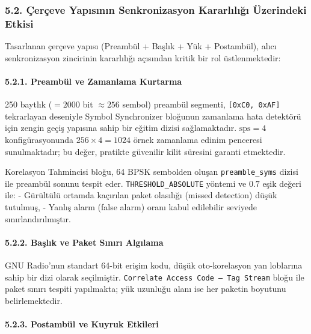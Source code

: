 \documentclass[
]{IEEEtran}
\begin{document}
\subsubsection{5.2. Çerçeve Yapısının Senkronizasyon Kararlılığı
Üzerindeki
Etkisi}\label{uxe7eruxe7eve-yapux131sux131nux131n-senkronizasyon-kararlux131lux131ux11fux131-uxfczerindeki-etkisi}

Tasarlanan çerçeve yapısı (Preambül + Başlık + Yük + Postambül), alıcı
senkronizasyon zincirinin kararlılığı açısından kritik bir rol
üstlenmektedir:

\paragraph{5.2.1. Preambül ve Zamanlama
Kurtarma}\label{preambuxfcl-ve-zamanlama-kurtarma}

250 baytlık (\(= 2000\) bit \(\approx 256\) sembol) preambül segmenti,
\texttt{{[}0xC0,\ 0xAF{]}} tekrarlayan deseniyle Symbol Synchronizer
bloğunun zamanlama hata detektörü için zengin geçiş yapısına sahip bir
eğitim dizisi sağlamaktadır. \(\text{sps} = 4\) konfigürasyonunda
\(256 \times 4 = 1024\) örnek zamanlama edinim penceresi sunulmaktadır;
bu değer, pratikte güvenilir kilit süresini garanti etmektedir.

Korelasyon Tahmincisi bloğu, 64 BPSK sembolden oluşan
\texttt{preamble\_syms} dizisi ile preambül sonunu tespit eder.
\texttt{THRESHOLD\_ABSOLUTE} yöntemi ve \(0.7\) eşik değeri ile: -
Gürültülü ortamda kaçırılan paket olasılığı (missed detection) düşük
tutulmuş, - Yanlış alarm (false alarm) oranı kabul edilebilir seviyede
sınırlandırılmıştır.

\paragraph{5.2.2. Başlık ve Paket Sınırı
Algılama}\label{baux15flux131k-ve-paket-sux131nux131rux131-algux131lama}

GNU Radio'nun standart 64-bit erişim kodu, düşük oto-korelasyon yan
loblarına sahip bir dizi olarak seçilmiştir.
\texttt{Correlate\ Access\ Code\ –\ Tag\ Stream} bloğu ile paket sınırı
tespiti yapılmakta; yük uzunluğu alanı ise her paketin boyutunu
belirlemektedir.

\paragraph{5.2.3. Postambül ve Kuyruk
Etkileri}\label{postambuxfcl-ve-kuyruk-etkileri}
\end{document}
